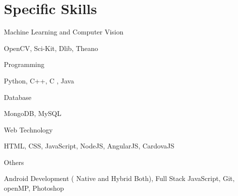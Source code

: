 \section{Specific Skills}

\begin{skill-env}
	\item Machine Learning and Computer Vision
		\begin{tightemize}
			\item OpenCV, Sci-Kit, Dlib, Theano
		\end{tightemize}

	\item Programming
		\begin{tightemize}
			\item Python, C++, C , Java
		\end{tightemize}
	
	\item Database
		\begin{tightemize}
			\item MongoDB, MySQL
		\end{tightemize}
		
	\item Web Technology
	\begin{tightemize}
		\item HTML, CSS, JavaScript, NodeJS, AngularJS, CardovaJS
	\end{tightemize}
	
	\item Others
	\begin{tightemize}
		\item Android Development ( Native and Hybrid Both), Full Stack JavaScript, Git, openMP, Photoshop
	\end{tightemize}
	
\end{skill-env}
\sectionsep